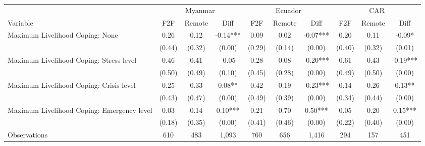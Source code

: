 \begin{tabular}{l*{9}c}
\hline\hline
 & \multicolumn{3}{c}{Myanmar} & \multicolumn{3}{c}{Ecuador} & \multicolumn{3}{c}{CAR}\\ 
Variable & F2F & Remote & Diff & F2F & Remote & Diff & F2F & Remote & Diff \\
\hline
Maximum Livelihood Coping: None&0.26&0.12&-0.14***&0.09&0.02&-0.07***&0.20&0.11&-0.09*\\
&(0.44)&(0.32)&(0.00)&(0.29)&(0.14)&(0.00)&(0.40)&(0.32)&(0.01)\\
Maximum Livelihood Coping: Stress level&0.46&0.41&-0.05&0.28&0.08&-0.20***&0.61&0.43&-0.19***\\
&(0.50)&(0.49)&(0.10)&(0.45)&(0.28)&(0.00)&(0.49)&(0.50)&(0.00)\\
Maximum Livelihood Coping: Crisis level&0.25&0.33&0.08**&0.42&0.19&-0.23***&0.14&0.26&0.13**\\
&(0.43)&(0.47)&(0.00)&(0.49)&(0.39)&(0.00)&(0.34)&(0.44)&(0.00)\\
Maximum Livelihood Coping: Emergency level&0.03&0.14&0.10***&0.21&0.70&0.50***&0.05&0.20&0.15***\\
&(0.18)&(0.35)&(0.00)&(0.41)&(0.46)&(0.00)&(0.22)&(0.40)&(0.00)\\
\hline
Observations & 610 & 483 & 1,093 & 760 & 656 & 1,416 & 294 & 157 & 451 \\
\hline\hline
\end{tabular}
